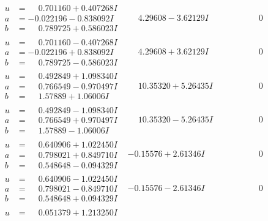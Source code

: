 \documentclass[1p]{elsarticle_modified}
\theoremstyle{definition}
\begin{document}
$$\begin{array}{c|c|c}
 \hline 
\begin{aligned}
u &= \phantom{-}0.701160 + 0.407268 I \\
a &= -0.022196 - 0.838092 I \\
b &= \phantom{-}0.789725 + 0.586023 I\end{aligned}
 & \phantom{-}4.29608 - 3.62129 I & \phantom{-0.000000 } 0 \\ \hline\begin{aligned}
u &= \phantom{-}0.701160 - 0.407268 I \\
a &= -0.022196 + 0.838092 I \\
b &= \phantom{-}0.789725 - 0.586023 I\end{aligned}
 & \phantom{-}4.29608 + 3.62129 I & \phantom{-0.000000 } 0 \\ \hline\begin{aligned}
u &= \phantom{-}0.492849 + 1.098340 I \\
a &= \phantom{-}0.766549 - 0.970497 I \\
b &= \phantom{-}1.57889 + 1.06006 I\end{aligned}
 & \phantom{-}10.35320 + 5.26435 I & \phantom{-0.000000 } 0 \\ \hline\begin{aligned}
u &= \phantom{-}0.492849 - 1.098340 I \\
a &= \phantom{-}0.766549 + 0.970497 I \\
b &= \phantom{-}1.57889 - 1.06006 I\end{aligned}
 & \phantom{-}10.35320 - 5.26435 I & \phantom{-0.000000 } 0 \\ \hline\begin{aligned}
u &= \phantom{-}0.640906 + 1.022450 I \\
a &= \phantom{-}0.798021 + 0.849710 I \\
b &= \phantom{-}0.548648 - 0.094329 I\end{aligned}
 & -0.15576 + 2.61346 I & \phantom{-0.000000 } 0 \\ \hline\begin{aligned}
u &= \phantom{-}0.640906 - 1.022450 I \\
a &= \phantom{-}0.798021 - 0.849710 I \\
b &= \phantom{-}0.548648 + 0.094329 I\end{aligned}
 & -0.15576 - 2.61346 I & \phantom{-0.000000 } 0 \\ \hline\begin{aligned}
u &= \phantom{-}0.051379 + 1.213250 I \\

\end{aligned}
\end{array}$$
\end{document}
